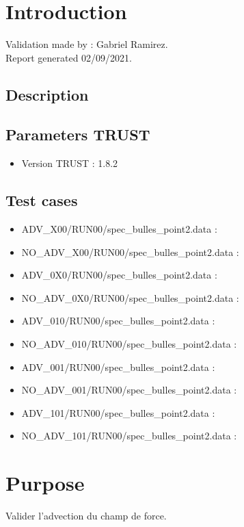 \section{Introduction}

Validation made by : Gabriel Ramirez.\\Report generated  02/09/2021.
\par\subsection{Description}

\par\subsection{Parameters TRUST }
\begin{itemize}
\item Version TRUST : 1.8.2
\end{itemize}
\par\subsection{Test cases}
\begin{itemize}
\item ADV\_X00/RUN00/spec\_bulles\_point2.data : \textit{}
\item NO\_ADV\_X00/RUN00/spec\_bulles\_point2.data : \textit{}
\item ADV\_0X0/RUN00/spec\_bulles\_point2.data : \textit{}
\item NO\_ADV\_0X0/RUN00/spec\_bulles\_point2.data : \textit{}
\item ADV\_010/RUN00/spec\_bulles\_point2.data : \textit{}
\item NO\_ADV\_010/RUN00/spec\_bulles\_point2.data : \textit{}
\item ADV\_001/RUN00/spec\_bulles\_point2.data : \textit{}
\item NO\_ADV\_001/RUN00/spec\_bulles\_point2.data : \textit{}
\item ADV\_101/RUN00/spec\_bulles\_point2.data : \textit{}
\item NO\_ADV\_101/RUN00/spec\_bulles\_point2.data : \textit{}
\end{itemize}

\section{Purpose}
Valider l'advection du champ de force. 

